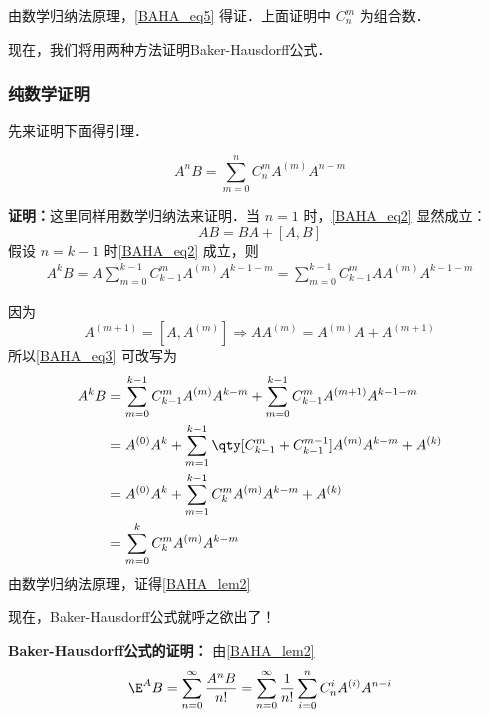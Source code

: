 由数学归纳法原理，\autoref{BAHA_eq5} 得证．上面证明中 $C_n^m$ 为组合数．

现在，我们将用两种方法证明Baker-Hausdorff公式．
\subsubsection{纯数学证明}
先来证明下面得引理．
\begin{lemma}{}\label{BAHA_lem2}
\begin{equation}\label{BAHA_eq2}
A^nB=\sum_{m=0}^{n}C_{n}^mA^{(m)}A^{n-m}
\end{equation}
\end{lemma}
\textbf{证明：}这里同样用数学归纳法来证明．当 $n=1$ 时，\autoref{BAHA_eq2} 显然成立：
\begin{equation}
AB=BA+[A,B]
\end{equation}
假设 $n=k-1$ 时\autoref{BAHA_eq2} 成立，则
\begin{equation}\label{BAHA_eq3}
\begin{aligned}
A^{k}B=A\sum_{m=0}^{k-1}C_{k-1}^mA^{(m)}A^{k-1-m}=\sum_{m=0}^{k-1}C_{k-1}^mAA^{(m)}A^{k-1-m}
\end{aligned}
\end{equation}

因为
\begin{equation}
A^{(m+1)}=[A,A^{(m)}]\Rightarrow AA^{(m)}=A^{(m)}A+A^{(m+1)}
\end{equation}
所以\autoref{BAHA_eq3} 可改写为
\begin{equation}
\begin{aligned}
A^k B&=\sum_{m=0}^{k-1}C_{k-1}^mA^{(m)}A^{k-m}+\sum_{m=0}^{k-1}C_{k-1}^mA^{(m+1)}A^{k-1-m}\\
&=A^{(0)}A^{k}+\sum_{m=1}^{k-1}\qty[C_{k-1}^m+C_{k-1}^{m-1}]A^{(m)}A^{k-m}+A^{(k)}\\
&=A^{(0)}A^{k}+\sum_{m=1}^{k-1}C_{k}^mA^{(m)}A^{k-m}+A^{(k)}\\
&=\sum_{m=0}^{k}C_{k}^mA^{(m)}A^{k-m}
\end{aligned}
\end{equation}
由数学归纳法原理，证得\autoref{BAHA_lem2} 

现在，Baker-Hausdorff公式就呼之欲出了！

\textbf{Baker-Hausdorff公式的证明：}
由\autoref{BAHA_lem2} 
\begin{equation}\label{BAHA_eq4}
\E^A B=\sum_{n=0}^{\infty}\frac{A^nB}{n!}=\sum_{n=0}^{\infty}\frac{1}{n!}\sum_{i=0}^{n}C_{n}^iA^{(i)}A^{n-i}
\end{equation}

